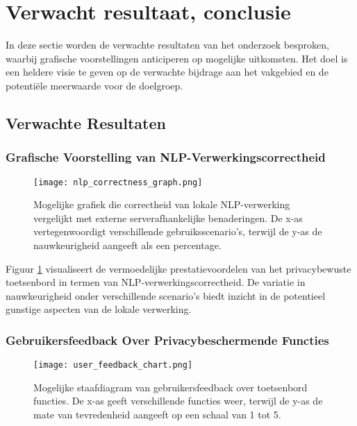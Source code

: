 \section{Verwacht resultaat, conclusie}%
\label{sec:verwachte_resultaten}

In deze sectie worden de verwachte resultaten van het onderzoek besproken, waarbij grafische voorstellingen anticiperen op mogelijke uitkomsten. Het doel is een heldere visie te geven op de verwachte bijdrage aan het vakgebied en de potentiële meerwaarde voor de doelgroep.

\subsection{Verwachte Resultaten}

\subsubsection{Grafische Voorstelling van NLP-Verwer\-kings\-correctheid}

\begin{figure}[ht]
    \centering
    \texttt{[image: nlp\_correctness\_graph.png]}
    \caption{Mogelijke grafiek die correctheid van lokale NLP-verwerking vergelijkt met externe serverafhankelijke benaderingen. De x-as vertegenwoordigt verschillende gebruiksscenario's, terwijl de y-as de nauwkeurigheid aangeeft als een percentage.}
    \label{fig:nlp_correctness}
\end{figure}

Figuur \ref{fig:nlp_correctness} visualiseert de vermoedelijke prestatievoordelen van het privacybewuste toetsenbord in termen van NLP-verwerkingscorrectheid. De variatie in nauwkeurigheid onder verschillende scenario's biedt inzicht in de potentieel gunstige aspecten van de lokale verwerking.

\subsubsection{Gebruikersfeedback Over Pri\-va\-cy\-be\-sch\-er\-mende Functies}

\begin{figure}[ht]
    \centering
    \texttt{[image: user\_feedback\_chart.png]}
    \caption{Mogelijke staafdiagram van gebruikersfeedback over toetsenbord functies. De x-as geeft verschillende functies weer, terwijl de y-as de mate van tevredenheid aangeeft op een schaal van 1 tot 5.}
    \label{fig:user_feedback}
\end{figure}

